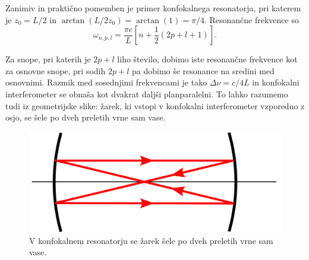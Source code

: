\noindent
Zanimiv in praktično pomemben je primer konfokalnega resonatorja,
pri katerem je $z_{0}=L/2$ in $\arctan(L/2z_{0})= \arctan(1)=\pi/4$. Resonančne frekvence
so 
\begin{equation}
\omega_{n,p,l}=\frac{\pi c}{L}\left[n+\frac{1}{2}(2p+l+1)\right].
\label{eq:omega_konf}
\end{equation}

\noindent
Za snope, pri katerih je $2p+l$ liho število, dobimo iste resonančne frekvence kot
za osnovne snope, pri sodih $2p+l$ pa dobimo še resonance na sredini
med osnovnimi. Razmik med sosednjimi frekvencami je tako $\Delta\nu=c/4L$
in konfokalni interferometer se obnaša kot dvakrat daljši planparalelni.
To lahko razumemo tudi iz geometrijske slike: žarek, ki vstopi v konfokalni
interferometer vzporedno z osjo, se šele po dveh preletih vrne sam
vase.

\begin{figure}[h]
\centering
\includegraphics[width=6truecm]{slike/04_Konfokalni.png}
\caption{V konfokalnem resonatorju se žarek šele po dveh preletih
vrne sam vase.}
\label{fig:Konfokalni_zarek}
\end{figure}

